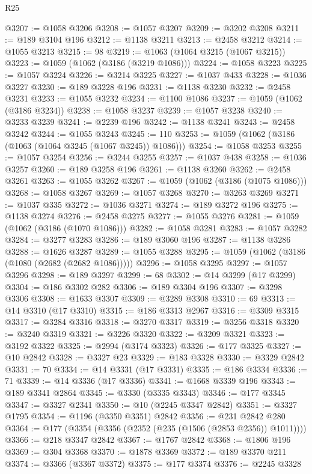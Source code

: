 \begin{lexlean}{R25}
\begin{coremodule}
@3207 := @1058 @3206
@3208 := @1057 @3207
@3209 := @3202 @3208
@3211 := @189 @3104 @196
@3212 := @1138 @3211
@3213 := @2458 @3212
@3214 := @1055 @3213
@3215 := 98
@3219 := @1063 (@1064 @3215 (@1067 @3215))
@3223 := @1059 (@1062 (@3186 (@3219 @1086)))
@3224 := @1058 @3223
@3225 := @1057 @3224
@3226 := @3214 @3225
@3227 := @1037 @433
@3228 := @1036 @3227
@3230 := @189 @3228 @196
@3231 := @1138 @3230
@3232 := @2458 @3231
@3233 := @1055 @3232
@3234 := @1100 @1086
@3237 := @1059 (@1062 (@3186 @3234))
@3238 := @1058 @3237
@3239 := @1057 @3238
@3240 := @3233 @3239
@3241 := @2239 @196
@3242 := @1138 @3241
@3243 := @2458 @3242
@3244 := @1055 @3243
@3245 := 110
@3253 := @1059 (@1062 (@3186 (@1063 (@1064 @3245 (@1067 @3245)) @1086)))
@3254 := @1058 @3253
@3255 := @1057 @3254
@3256 := @3244 @3255
@3257 := @1037 @438
@3258 := @1036 @3257
@3260 := @189 @3258 @196
@3261 := @1138 @3260
@3262 := @2458 @3261
@3263 := @1055 @3262
@3267 := @1059 (@1062 (@3186 (@1075 @1086)))
@3268 := @1058 @3267
@3269 := @1057 @3268
@3270 := @3263 @3269
@3271 := @1037 @335
@3272 := @1036 @3271
@3274 := @189 @3272 @196
@3275 := @1138 @3274
@3276 := @2458 @3275
@3277 := @1055 @3276
@3281 := @1059 (@1062 (@3186 (@1070 @1086)))
@3282 := @1058 @3281
@3283 := @1057 @3282
@3284 := @3277 @3283
@3286 := @189 @3060 @196
@3287 := @1138 @3286
@3288 := @1626 @3287
@3289 := @1055 @3288
@3295 := @1059 (@1062 (@3186 (@1080 (@2682 (@2682 @1086)))))
@3296 := @1058 @3295
@3297 := @1057 @3296
@3298 := @189 @3297
@3299 := 68
@3302 := @14 @3299 (@17 @3299)
@3304 := @186 @3302 @282
@3306 := @189 @3304 @196
@3307 := @3298 @3306
@3308 := @1633 @3307
@3309 := @3289 @3308
@3310 := 69
@3313 := @14 @3310 (@17 @3310)
@3315 := @186 @3313 @2967
@3316 := @3309 @3315
@3317 := @3284 @3316
@3318 := @3270 @3317
@3319 := @3256 @3318
@3320 := @3240 @3319
@3321 := @3226 @3320
@3322 := @3209 @3321
@3323 := @3192 @3322
@3325 := @2994 (@3174 @3323)
@3326 := @177 @3325
@3327 := @10 @2842
@3328 := @3327 @23
@3329 := @183 @3328
@3330 := @3329 @2842
@3331 := 70
@3334 := @14 @3331 (@17 @3331)
@3335 := @186 @3334
@3336 := 71
@3339 := @14 @3336 (@17 @3336)
@3341 := @1668 @3339 @196
@3343 := @189 @3341 @2864
@3345 := @3330 (@3335 @3343)
@3346 := @177 @3345
@3347 := @3327 @2341
@3350 := @10 (@2245 @3347 @2842)
@3351 := @3327 @1795
@3354 := @1196 (@3350 @3351) @2842
@3356 := @231 @2842 @280
@3364 := @177 (@3354 (@3356 (@2352 (@235 (@1506 (@2853 @2356)) @1011))))
@3366 := @218 @3347 @2842
@3367 := @1767 @2842
@3368 := @1806 @196
@3369 := @304 @3368
@3370 := @1878 @3369
@3372 := @189 @3370 @211
@3374 := @3366 (@3367 @3372)
@3375 := @177 @3374
@3376 := @2245 @3328

\end{coremodule}
\end{lexlean}
